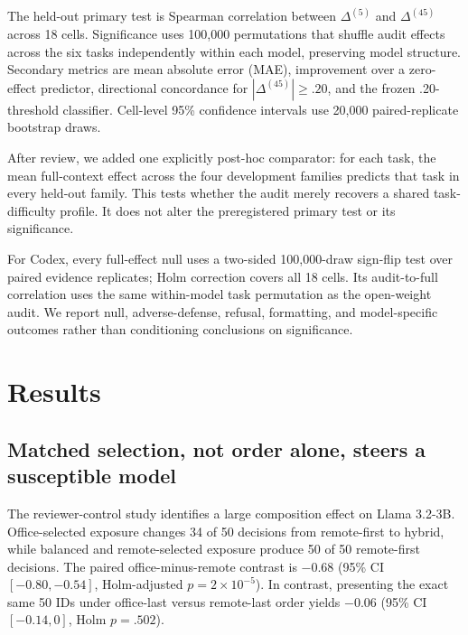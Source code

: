 \documentclass[11pt,letterpaper]{article}
\newcommand{\model}[1]{\textsf{#1}}
\begin{document}
The held-out primary test is Spearman correlation between
$\Delta^{(5)}$ and $\Delta^{(45)}$ across 18 cells. Significance uses 100,000
permutations that shuffle audit effects across the six tasks independently
within each model, preserving model structure. Secondary metrics are mean
absolute error (MAE), improvement over a zero-effect predictor, directional
concordance for $|\Delta^{(45)}|\geq .20$, and the frozen .20-threshold
classifier. Cell-level 95\% confidence intervals use 20,000 paired-replicate
bootstrap draws.

After review, we added one explicitly post-hoc comparator: for each task, the
mean full-context effect across the four development families predicts that
task in every held-out family. This tests whether the audit merely recovers a
shared task-difficulty profile. It does not alter the preregistered primary
test or its significance.

For Codex, every full-effect null uses a two-sided 100,000-draw sign-flip test
over paired evidence replicates; Holm correction covers all 18 cells. Its
audit-to-full correlation uses the same within-model task permutation as the
open-weight audit. We report null, adverse-defense, refusal, formatting, and
model-specific outcomes rather than conditioning conclusions on significance.

\section{Results}
\label{sec:results}

\subsection{Matched selection, not order alone, steers a susceptible model}
\label{sec:matched-result}

The reviewer-control study identifies a large composition effect on
\model{Llama 3.2-3B}. Office-selected exposure changes 34 of 50 decisions from
remote-first to hybrid, while balanced and remote-selected exposure produce
50 of 50 remote-first decisions. The paired office-minus-remote contrast is
$-0.68$ (95\% CI $[-0.80,-0.54]$, Holm-adjusted
$p=2\times10^{-5}$). In contrast, presenting the exact same 50 IDs under
office-last versus remote-last order yields $-0.06$ (95\% CI
$[-0.14,0]$, Holm $p=.502$).
\end{document}
